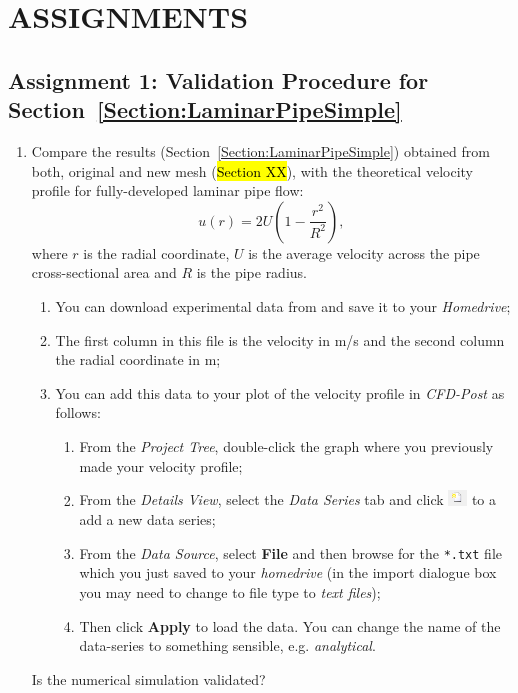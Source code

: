 \documentclass[11pt,a4paper,oneside,hidelinks]{scrartcl}
\newcommand\bfr[1]{\textcolor[rgb]{1,0.00,0.00}{\textbf{\textsf{#1}}}}
\begin{document}
\section{ASSIGNMENTS}%
\subsection{Assignment 1: Validation Procedure for Section~\ref{Section:LaminarPipeSimple}}

\begin{enumerate}
   \item Compare the results (Section~\ref{Section:LaminarPipeSimple}) obtained from both, original and new mesh (\hl{Section XX}), with the theoretical velocity profile for fully-developed laminar pipe flow:
      \begin{equation}
          u(r)=2U\left(1-\frac{r^2}{R^2}\right),
      \end{equation}
where $r$ is the radial coordinate, $U$ is the average velocity across the pipe cross-sectional area and $R$ is the pipe radius. 
       \begin{enumerate}
          \item You can download experimental data from  and save it to your \emph{Homedrive};
          \item The first column in this file is the velocity in m/s and the second column the radial coordinate in m; 
          \item You can add this data to your plot of the velocity profile in \emph{CFD-Post} as follows: 
            \begin{enumerate}
                 \item From the \emph{Project Tree}, double-click the graph where you previously made your velocity profile;
                 \item From the \emph{Details View}, select the \emph{Data Series} tab and click \includegraphics[width=0.5cm,clip]{new_symbol.png} to a add a new data series;
                 \item From the \emph{Data Source}, select \bfr{File} and then browse for the \texttt{*.txt} file which you just saved to your \emph{homedrive} (in the import dialogue box you may need to change to file type to \emph{text files});
                 \item Then click \bfr{Apply} to load the data. You can change the name of the data-series to something sensible, e.g. \emph{analytical}. 
            \end{enumerate}
      \end{enumerate}
Is the numerical simulation validated?


\end{enumerate}
\end{document}
